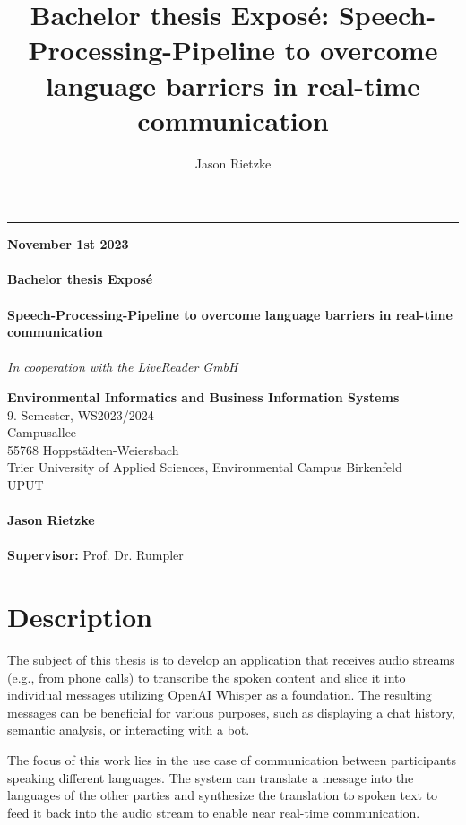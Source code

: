 \documentclass[a4paper,10pt]{article}
\title{Bachelor thesis Exposé: Speech-Processing-Pipeline to overcome language barriers in real-time communication}
\author{Jason Rietzke}
\begin{document}
\begin{titlepage}
	\raggedleft

	\rule{1pt}{\textheight}
	\hspace{0.05\textwidth}
	\parbox[b]{0.85\textwidth}{

		{\textbf{November 1st 2023}}\\\\
		{\Huge\bfseries Bachelor thesis Exposé \\[0.5\baselineskip]}\\[2\baselineskip]
		{\Large\bfseries Speech-Processing-Pipeline to overcome language barriers in real-time communication \\[0.5\baselineskip]}\\[2\baselineskip]
		{\large\textit{In cooperation with the LiveReader GmbH}}\\[4\baselineskip]

		\vspace{0.28\textheight}

		{\textbf{Environmental Informatics and Business Information Systems}\\}
		{9. Semester, WS2023/2024}\\
		{Campusallee}\\
		{55768 Hoppstädten-Weiersbach}\\
		{Trier University of Applied Sciences, Environmental Campus Birkenfeld}\\
		{UPUT}\\
		\\
		{\textbf{Jason Rietzke}\\}
		\\
		{\textbf{Supervisor:} Prof. Dr. Rumpler}\\
	}

\end{titlepage}

\restoregeometry
\nopagecolor


\section{Description}
The subject of this thesis is to develop an application that receives audio streams (e.g., from phone calls) to transcribe the spoken content and slice it into individual messages utilizing OpenAI Whisper as a foundation.
The resulting messages can be beneficial for various purposes, such as displaying a chat history, semantic analysis, or interacting with a bot.

The focus of this work lies in the use case of communication between participants speaking different languages. 
The system can translate a message into the languages of the other parties and synthesize the translation to spoken text to feed it back into the audio stream to enable near real-time communication.
\end{document}

